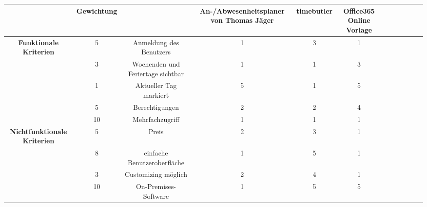 \begin{table}[!ht]
    \centering
    \begin{tabular}{|c|c|c|c|c|c|c|c|c|c|}
        \hline
        \textbf{}                           & \textbf{Gewichtung} & \textbf{}                         & \textbf{An-/Abwesenheitsplaner von Thomas Jäger} & \textbf{timebutler} & \textbf{Office365 Online Vorlage } & \textbf{} & \textbf{} & \textbf{} & \textbf{} \\ \hline
        \textbf{Funktionale Kriterien}      & 5                   & Anmeldung des Benutzers           & 1                                                & 3                   & 1                                  & ~         & ~         & ~         & ~         \\ \hline
        \textbf{}                           & 3                   & Wochenden und Feriertage sichtbar & 1                                                & 1                   & 3                                  & ~         & ~         & ~         & ~         \\ \hline
        \textbf{}                           & 1                   & Aktueller Tag markiert            & 5                                                & 1                   & 5                                  & ~         & ~         & ~         & ~         \\ \hline
        \textbf{}                           & 5                   & Berechtigungen                    & 2                                                & 2                   & 4                                  & ~         & ~         & ~         & ~         \\ \hline
        \textbf{}                           & 10                  & Mehrfachzugriff                   & 1                                                & 1                   & 1                                  & ~         & ~         & ~         & ~         \\ \hline
        \textbf{Nichtfunktionale Kriterien} & 5                   & Preis                             & 2                                                & 3                   & 1                                  & ~         & ~         & ~         & ~         \\ \hline
        \textbf{}                           & 8                   & einfache Benutzeroberfläche       & 1                                                & 5                   & 1                                  & ~         & ~         & ~         & ~         \\ \hline
        \textbf{}                           & 3                   & Customizing möglich               & 2                                                & 4                   & 1                                  & ~         & ~         & ~         & ~         \\ \hline
        \textbf{}                           & 10                  & On-Premises-Software              & 1                                                & 5                   & 5                                  & ~         & ~         & ~         & ~         \\ \hline
    \end{tabular}
\end{table}